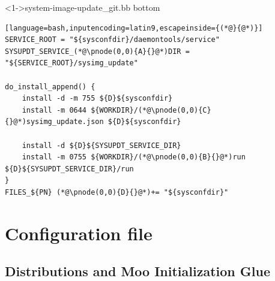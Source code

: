 \documentclass[ngerman,xcolor={table,dvipsnames},smaller,compress,hyperref={bookmarks,colorlinks},handout]{beamer}%
\begin{document}
\begin{frame}[t,fragile]

\begin{block}<1->{system-image-update\_git.bb bottom}
\scriptsize
\begin{lstlisting}[language=bash,inputencoding=latin9,escapeinside={(*@}{@*)}]
SERVICE_ROOT = "${sysconfdir}/daemontools/service"
SYSUPDT_SERVICE_(*@\pnode(0,0){A}{}@*)DIR = "${SERVICE_ROOT}/sysimg_update"

do_install_append() {
    install -d -m 755 ${D}${sysconfdir}
    install -m 0644 ${WORKDIR}/(*@\pnode(0,0){C}{}@*)sysimg_update.json ${D}${sysconfdir}

    install -d ${D}${SYSUPDT_SERVICE_DIR}
    install -m 0755 ${WORKDIR}/(*@\pnode(0,0){B}{}@*)run ${D}${SYSUPDT_SERVICE_DIR}/run
}
FILES_${PN} (*@\pnode(0,0){D}{}@*)+= "${sysconfdir}"
\end{lstlisting}
\end{block}

\begin{itemize}
\end{itemize}



\end{frame}

\section{Configuration file}

\subsection{Distributions and Moo Initialization Glue}
\end{document}
